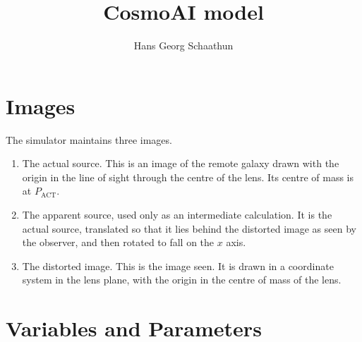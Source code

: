\documentclass{scrartcl}
\title{CosmoAI model}
\author{Hans Georg Schaathun}
\begin{document}
\maketitle


\section{Images}

The simulator maintains three images.

\begin{enumerate}
   \item The actual source.  This is an image of the remote galaxy drawn with
      the origin in the line of sight through the centre of the lens.
      Its centre of mass is at $P_{\mathrm{ACT}}$.
   \item The apparent source, used only as an intermediate calculation.  
      It is the actual source, translated so that it lies behind the distorted
      image as seen by the observer, and then rotated to fall on the $x$ axis.
   \item The distorted image.  This is the image seen.  It is drawn in a coordinate
      system in the lens plane, with the origin in the centre of mass of the lens.
\end{enumerate}

\section{Variables and Parameters}
\end{document}
